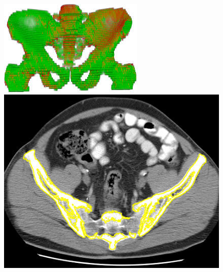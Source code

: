{\begin{enumerate}
\begin{figure}[]
%
\begin{minipage}[b]{.42\linewidth}
  \centering
\centerline{\includegraphics[width=\linewidth]{figures/research/cd03_0003_overlay_3d_gc}}
\vspace{1mm}
\end{minipage}
\hfill
\begin{minipage}[b]{0.42\linewidth}
  \centering
  \centerline{\includegraphics[width=\linewidth]{figures/research/d03_0003_Reg_Overlay_0015_cut}}
\vspace{1mm}
\end{minipage}\\
\begin{minipage}[b]{.42\linewidth}
  \centering

\end{minipage}
\end{figure}
\end{enumerate}}
